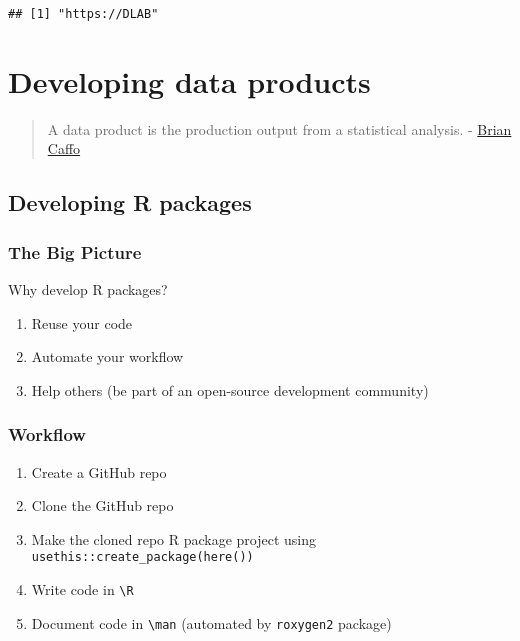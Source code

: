 \documentclass[
]{book}
\providecommand{\tightlist}{%
  \setlength{\itemsep}{0pt}\setlength{\parskip}{0pt}}
\begin{document}
\begin{verbatim}
## [1] "https://DLAB"
\end{verbatim}

\hypertarget{products}{%
\chapter{Developing data products}\label{products}}

\begin{quote}
A data product is the production output from a statistical analysis. - \href{https://sites.google.com/view/bcaffo/home}{Brian Caffo}
\end{quote}

\hypertarget{developing-r-packages}{%
\section{Developing R packages}\label{developing-r-packages}}

\hypertarget{the-big-picture-6}{%
\subsection{The Big Picture}\label{the-big-picture-6}}

Why develop R packages?

\begin{enumerate}
\def\labelenumi{\arabic{enumi}.}
\tightlist
\item
  Reuse your code
\item
  Automate your workflow
\item
  Help others (be part of an open-source development community)
\end{enumerate}

\hypertarget{workflow}{%
\subsection{Workflow}\label{workflow}}

\begin{enumerate}
\def\labelenumi{\arabic{enumi}.}
\tightlist
\item
  Create a GitHub repo
\item
  Clone the GitHub repo
\item
  Make the cloned repo R package project using \texttt{usethis::create\_package(here())}
\item
  Write code in \texttt{\textbackslash{}R}
\item
  Document code in \texttt{\textbackslash{}man} (automated by \texttt{roxygen2} package)
\end{enumerate}
\end{document}
